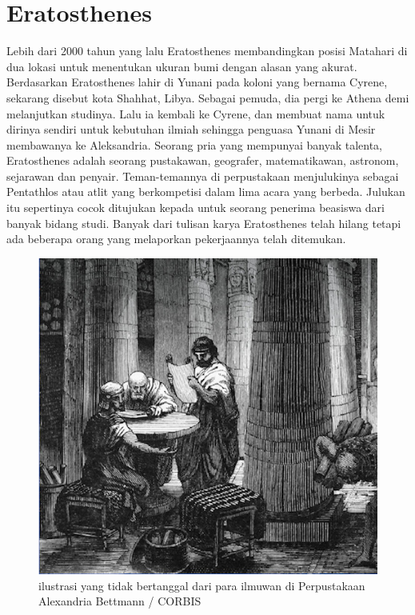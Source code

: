 
\section{Eratosthenes}
Lebih dari 2000 tahun yang lalu Eratosthenes membandingkan posisi Matahari di dua lokasi untuk menentukan ukuran bumi dengan alasan yang akurat.
Berdasarkan \cite{plochmann1983dictionary} Eratosthenes lahir di Yunani pada koloni yang bernama Cyrene, sekarang disebut kota Shahhat, Libya. Sebagai pemuda, dia  pergi ke Athena demi melanjutkan studinya. Lalu ia kembali ke Cyrene, dan membuat nama untuk dirinya sendiri untuk kebutuhan ilmiah sehingga penguasa Yunani di Mesir membawanya ke Aleksandria.
Seorang pria yang mempunyai banyak talenta, Eratosthenes adalah seorang pustakawan, geografer, matematikawan, astronom, sejarawan dan penyair. Teman-temannya di perpustakaan menjulukinya sebagai Pentathlos atau atlit yang berkompetisi dalam lima acara yang berbeda. Julukan itu sepertinya cocok ditujukan kepada untuk seorang penerima beasiswa dari banyak bidang studi. Banyak dari tulisan karya Eratosthenes telah hilang tetapi ada beberapa orang yang melaporkan pekerjaannya telah ditemukan\cite{lasky2008librarian}.
\begin{figure}[ht]
	\centerline{\includegraphics[width=1\textwidth]{figures/illustrasi.jpg}}
	\caption{ilustrasi yang tidak bertanggal dari para ilmuwan di Perpustakaan Alexandria Bettmann / CORBIS}
	\label{illustrasi}
	\end{figure}
